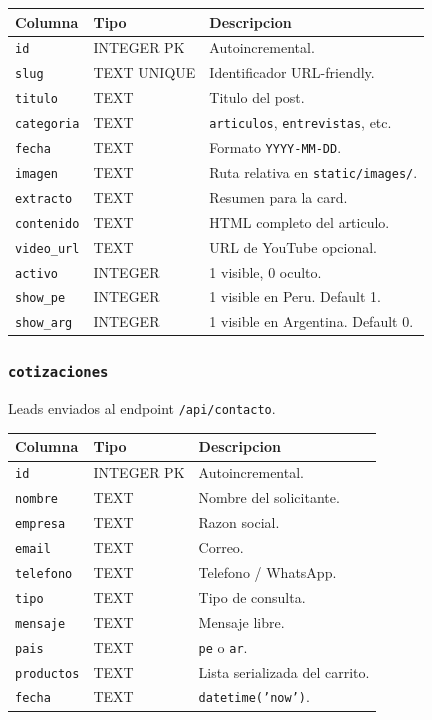 \documentclass[11pt,a4paper]{article}
\begin{document}
\begin{longtable}{p{3.2cm} p{2cm} p{8cm}}
\toprule
\textbf{Columna} & \textbf{Tipo} & \textbf{Descripcion} \\
\midrule
\endhead
\texttt{id}        & INTEGER PK  & Autoincremental. \\
\texttt{slug}      & TEXT UNIQUE & Identificador URL-friendly. \\
\texttt{titulo}    & TEXT        & Titulo del post. \\
\texttt{categoria} & TEXT        & \texttt{articulos}, \texttt{entrevistas}, etc. \\
\texttt{fecha}     & TEXT        & Formato \texttt{YYYY-MM-DD}. \\
\texttt{imagen}    & TEXT        & Ruta relativa en \texttt{static/images/}. \\
\texttt{extracto}  & TEXT        & Resumen para la card. \\
\texttt{contenido} & TEXT        & HTML completo del articulo. \\
\texttt{video\_url} & TEXT       & URL de YouTube opcional. \\
\texttt{activo}    & INTEGER     & 1 visible, 0 oculto. \\
\texttt{show\_pe}  & INTEGER     & 1 visible en Peru. Default 1. \\
\texttt{show\_arg} & INTEGER     & 1 visible en Argentina. Default 0. \\
\bottomrule
\end{longtable}

\subsubsection{\texttt{cotizaciones}}
Leads enviados al endpoint \texttt{/api/contacto}.

\begin{longtable}{p{3cm} p{2cm} p{9cm}}
\toprule
\textbf{Columna} & \textbf{Tipo} & \textbf{Descripcion} \\
\midrule
\endhead
\texttt{id}        & INTEGER PK & Autoincremental. \\
\texttt{nombre}    & TEXT       & Nombre del solicitante. \\
\texttt{empresa}   & TEXT       & Razon social. \\
\texttt{email}     & TEXT       & Correo. \\
\texttt{telefono}  & TEXT       & Telefono / WhatsApp. \\
\texttt{tipo}      & TEXT       & Tipo de consulta. \\
\texttt{mensaje}   & TEXT       & Mensaje libre. \\
\texttt{pais}      & TEXT       & \texttt{pe} o \texttt{ar}. \\
\texttt{productos} & TEXT       & Lista serializada del carrito. \\
\texttt{fecha}     & TEXT       & \texttt{datetime('now')}. \\
\bottomrule
\end{longtable}
\end{document}
